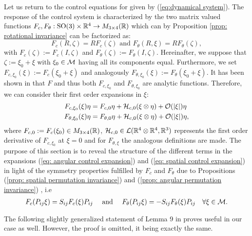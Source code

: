 Let us return to the control equations for \spr given by (\ref{eq:dynamical system}). The response of the control system is characterized by the two matrix valued functions $F_c, F_{\theta}: \operatorname{SO}(3) \times \mathbb{R}^4 \to M_{3 \times 4}(\mathbb{R})$ which can by Proposition \ref{prop: rotational invariance} can be factorized as:
\begin{equation}
\label{eq: reminder control system}
	F_{c}(R, \zeta) = R F_{c}(\zeta) \text{ and } F_{\theta}(R, \xi) = R F_{\theta}(\zeta),
\end{equation}
with $F_{c}(\zeta) := F_c(I, \zeta)$ and $F_{\theta}(\zeta) := F_{\theta}(I, \zeta)$. Hereinafter, we suppose that $\zeta := \xi_0 + \xi$ with $\xi_0 \in \mathcal{M}$ having all its components equal. Furthermore, we set $F_{c, \xi_0}(\xi) := F_{c}(\xi_0 + \xi)$ and analogously $F_{\theta, \xi_0}(\xi) := F_{\theta}(\xi_0 + \xi)$. It has been shown in \cite{Alouges2013} that $F$ and thus both $F_{ c, \xi_0}$ and $F_{\theta, \xi_0}$ are analytic functions. Therefore, we can consider their first order expansions in $\xi$:
\begin{align}
\label{eq: spatial control expansion}
	F_{c, \xi_0}(\xi)\eta &= F_{c, 0} \eta  + \mathcal{H}_{c,0}(\xi \otimes \eta) + \mathcal{O}(|\xi|)\eta\\
\label{eq: angular control expansion}
	F_{\theta, \xi_0}(\xi) \eta &= F_{\theta, 0} \eta + \mathcal{H}_{c, 0}(\xi \otimes \eta) + \mathcal{O}(|\xi|)\eta,
\end{align}
where $F_{c,0} := F_{c}(\xi_0) \in M_{3 \times 4}(\mathbb{R})$, $\mathcal{H}_{c,0}\in \mathcal{L}(\mathbb{R}^4 \otimes \mathbb{R}^4, \mathbb{R}^3)$ represents the first order derivative of $F_{c, \xi_0}$ at $\xi = 0$ and for $F_{\theta, \xi}$ the analogous definitions are made.
The purpose of this section is to reveal the structure of the different terms in the expansions (\ref{eq: angular control expansion}) and (\ref{eq: spatial control expansion}) in light of the symmetry properties fulfilled by $F_{c}$ and $F_{\theta}$ due to Propositions (\ref{prop: spatial permutation invariance}) and (\ref{prop: angular permutation invariance}) , i.e
\begin{align}
\label{eq: spatial and angular first order expansion}
	F_{c}(P_{ij} \xi) = S_{ij} F_{c}(\xi) P_{ij}& & \text{ and } & & 			F_{\theta}(P_{ij} \xi) = - S_{ij} F_{\theta}(\xi) P_{ij} & & \forall \xi \in \mathcal{M}.
\end{align}

The following slightly generalized statement of Lemma 9 in \cite{Alouges2017} proves useful in our case as well. However, the proof is omitted, it being exactly the same.

